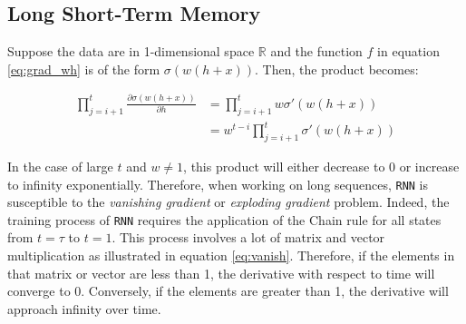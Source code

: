 \subsection{Long Short-Term Memory}


Suppose the data are in 1-dimensional space $\mathbb{R}$ and the function $f$ in equation \ref{eq:grad_wh} is of the form $\sigma(w(h+x))$. Then, the product becomes:

\begin{align}
    \prod_{j=i+1}^t {\frac{\partial \sigma(w(h+x))}{\partial h}} &= \prod_{j=i+1}^t {w \sigma'(w(h+x))}\\
    &= w^{t-i} \prod_{j=i+1}^t {\sigma'(w(h+x))}
    \label{eq:vanish}
\end{align}


In the case of large $t$ and $w \ne 1$, this product will either decrease to 0 or increase to infinity exponentially. Therefore, when working on long sequences, \verb|RNN| is susceptible to the \textit{vanishing gradient} or \textit{exploding gradient} problem. Indeed, the training process of \verb|RNN| requires the application of the Chain rule for all states from $t=\tau$ to $t=1$. This process involves a lot of matrix and vector multiplication as illustrated in equation \ref{eq:vanish}. Therefore, if the elements in that matrix or vector are less than 1, the derivative with respect to time will converge to 0. Conversely, if the elements are greater than 1, the derivative will approach infinity over time.


